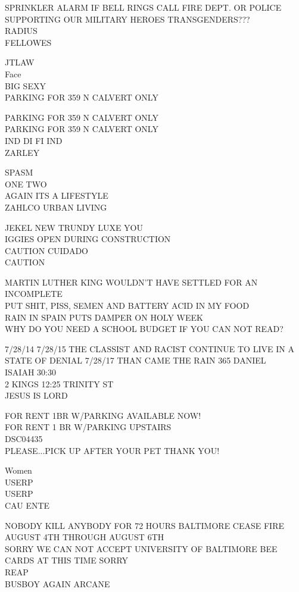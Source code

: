 \documentclass[10pt,letterpaper]{article}
\begin{document}
SPRINKLER ALARM IF BELL RINGS CALL FIRE DEPT. OR POLICE\\
SUPPORTING OUR MILITARY HEROES TRANSGENDERS???\\
RADIUS\\
FELLOWES

JTLAW\\
Face\\
BIG SEXY\\
PARKING FOR 359 N CALVERT ONLY

PARKING FOR 359 N CALVERT ONLY\\
PARKING FOR 359 N CALVERT ONLY\\
IND DI FI IND\\
ZARLEY

SPASM\\
ONE TWO\\
AGAIN ITS A LIFESTYLE\\
ZAHLCO URBAN LIVING

JEKEL NEW TRUNDY LUXE YOU\\
IGGIES OPEN DURING CONSTRUCTION\\
CAUTION CUIDADO\\
CAUTION

MARTIN LUTHER KING WOULDN'T HAVE SETTLED FOR AN INCOMPLETE\\
PUT SHIT, PISS, SEMEN AND BATTERY ACID IN MY FOOD\\
RAIN IN SPAIN PUTS DAMPER ON HOLY WEEK\\
WHY DO YOU NEED A SCHOOL BUDGET IF YOU CAN NOT READ?

7/28/14 7/28/15 THE CLASSIST AND RACIST CONTINUE TO LIVE IN A STATE OF DENIAL 7/28/17 THAN CAME THE RAIN 365 DANIEL\\
ISAIAH 30:30\\
2 KINGS 12:25 TRINITY ST\\
JESUS IS LORD

FOR RENT 1BR W/PARKING AVAILABLE NOW!\\
FOR RENT 1 BR W/PARKING UPSTAIRS\\
DSC04435\\
PLEASE...PICK UP AFTER YOUR PET THANK YOU!

Women\\
USERP\\
USERP\\
CAU ENTE

NOBODY KILL ANYBODY FOR 72 HOURS BALTIMORE CEASE FIRE AUGUST 4TH THROUGH AUGUST 6TH\\
SORRY WE CAN NOT ACCEPT UNIVERSITY OF BALTIMORE BEE CARDS AT THIS TIME SORRY\\
REAP\\
BUSBOY AGAIN ARCANE
\end{document}
